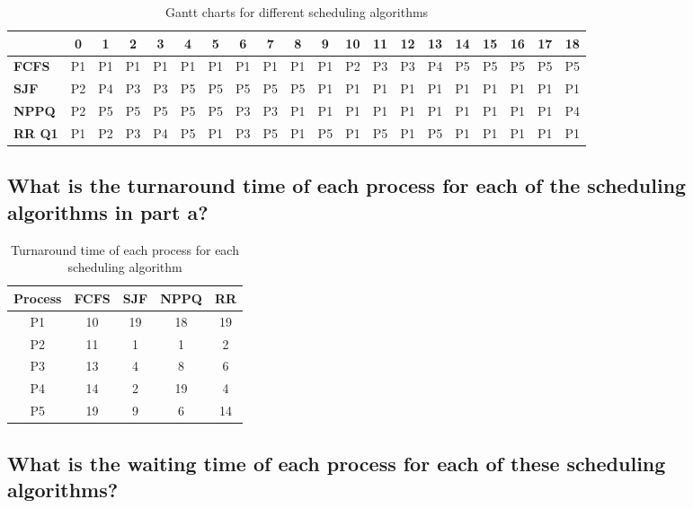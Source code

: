 \documentclass[letterpaper, 10pt,DIV=13]{scrartcl}
\numberwithin{equation}{section} %
\numberwithin{figure}{section} %
\numberwithin{table}{section} %
\begin{document}
\begin{table}[h!]
    \centering
    \begin{tabular}{l|ccccccccccccccccccc}
         & 0 & 1 & 2 & 3 & 4 & 5 & 6 & 7 & 8 & 9 & 10 & 11 & 12 & 13 & 14 & 15 & 16 & 17 & 18 \\
        \hline
        \textbf{FCFS} & P1 & P1 & P1 & P1 & P1 & P1 & P1 & P1 & P1 & P1 & P2 & P3 & P3 & P4 & P5 & P5 & P5 & P5 & P5 \\
        \textbf{SJF} & P2 & P4 & P3 & P3 & P5 & P5 & P5 & P5 & P5 & P1 & P1 & P1 & P1 & P1 & P1 & P1 & P1 & P1 & P1 \\
        \textbf{NPPQ} & P2 & P5 & P5 & P5 & P5 & P5 & P3 & P3 & P1 & P1 & P1 & P1 & P1 & P1 & P1 & P1 & P1 & P1 & P4 \\
        \textbf{RR Q1} & P1 & P2 & P3 & P4 & P5 & P1 & P3 & P5 & P1 & P5 & P1 & P5 & P1 & P5 & P1 & P1 & P1 & P1 & P1 \\
    \end{tabular}
    \caption{Gantt charts for different scheduling algorithms}
    \label{tab:gantt_charts}
\end{table}

\subsection{What is the turnaround time of each process for each of the scheduling algorithms in part a?}

\begin{table}[h!]
    \centering
    \begin{tabular}{|c|c|c|c|c|}
        \hline
        \textbf{Process} & \textbf{FCFS} & \textbf{SJF} & \textbf{NPPQ} & \textbf{RR} \\
        \hline
        P1 & 10 & 19 & 18 & 19 \\
        \hline
        P2 & 11 & 1 & 1 & 2 \\
        \hline
        P3 & 13 & 4 & 8 & 6 \\
        \hline
        P4 & 14 & 2 & 19 & 4 \\
        \hline
        P5 & 19 & 9 & 6 & 14 \\
        \hline
    \end{tabular}
    \caption{Turnaround time of each process for each scheduling algorithm}
    \label{tab:turnaround_time}
\end{table}

\subsection{What is the waiting time of each process for each of these scheduling algorithms?}
\end{document}

